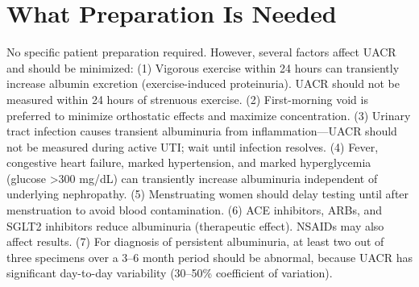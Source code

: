 \section*{What Preparation Is Needed}
No specific patient preparation required. However, several factors affect UACR and should be minimized: (1) Vigorous exercise within 24 hours can transiently increase albumin excretion (exercise-induced proteinuria). UACR should not be measured within 24 hours of strenuous exercise. (2) First-morning void is preferred to minimize orthostatic effects and maximize concentration. (3) Urinary tract infection causes transient albuminuria from inflammation---UACR should not be measured during active UTI; wait until infection resolves. (4) Fever, congestive heart failure, marked hypertension, and marked hyperglycemia (glucose >300 mg/dL) can transiently increase albuminuria independent of underlying nephropathy. (5) Menstruating women should delay testing until after menstruation to avoid blood contamination. (6) ACE inhibitors, ARBs, and SGLT2 inhibitors reduce albuminuria (therapeutic effect). NSAIDs may also affect results. (7) For diagnosis of persistent albuminuria, at least two out of three specimens over a 3--6 month period should be abnormal, because UACR has significant day-to-day variability (30--50\% coefficient of variation).

